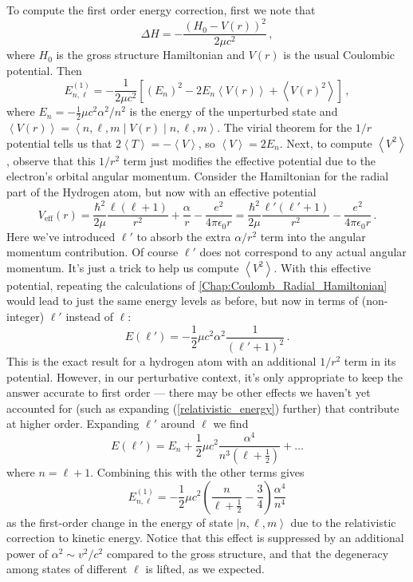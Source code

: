 \documentclass{article}
\theoremstyle{plain}\theoremheaderfont{\normalfont\itshape}\theorembodyfont{\rmfamily}\theoremseparator{.}\newtheorem*{rem}{Remark}\newtheorem*{ex}{Example}\newtheorem*{proof}{Proof}\newtheorem*{altp}{Alternative proof}
\theoremstyle{plain}\theoremheaderfont{\normalfont\bfseries}\theorembodyfont{\rmfamily}\theoremseparator{.}\newtheorem{thm}{Theorem}[section]\newtheorem{lem}[thm]{Lemma}\newtheorem{prop}[thm]{Proposition}\newtheorem*{cor}{Corollary}\newtheorem{defn}[thm]{Definition}\newtheorem{clm}[thm]{Claim}\newtheorem{clminproof}{Claim}
\theoremstyle{break}\theoremheaderfont{\normalfont\itshape}\theorembodyfont{\rmfamily}\theoremseparator{.\medskip}\newtheorem*{proofskip}{Proof}\newtheorem*{exs}{Examples}\newtheorem*{rems}{Remarks}
\theoremstyle{break}\theoremheaderfont{\normalfont\bfseries}\theorembodyfont{\rmfamily}\theoremseparator{.\medskip}\newtheorem{lemskip}[thm]{Lemma}\newtheorem{defnskip}[thm]{Definition}\newtheorem{propskip}[thm]{Proposition}\newtheorem{thmskip}[thm]{Theorem}
\numberwithin{equation}{section}
\newcommand{\ket}[1]{\left| #1 \right\rangle}
\newcommand{\eval}[1]{\left\langle #1 \right\rangle}
\newcommand{\expval}[2]{\left\langle #2 \middle| #1 \middle| #2 \right\rangle}
\begin{document}
    To compute the first order energy correction, first we note that
    \begin{equation}
        \Delta H=-\frac{(H_0-V(r))^2}{2\mu c^2}\,,
    \end{equation}
    where \(H_0\) is the gross structure Hamiltonian and \(V(r)\) is the usual Coulombic potential. Then
    \begin{equation}
        E_{n,\ell}^{(1)}=-\frac{1}{2\mu c^2}[(E_n)^2-2E_n\eval{V(r)}+\eval{V(r)^2}]\,,
    \end{equation}
    where \(E_n=-\frac{1}{2}\mu c^2\alpha^2/n^2\) is the energy of the unperturbed state and \(\eval{V(r)}=\expval{V(r)}{n,\ell,m}\). The virial theorem for the \(1/r\) potential tells us that \(2\eval{T}=-\eval{V}\), so \(\eval{V}=2E_n\). Next, to compute \(\eval{V^2}\), observe that this \(1/r^2\) term just modifies the effective potential due to the electron's orbital angular momentum. Consider the Hamiltonian for the radial part of the Hydrogen atom, but now with an effective potential
    \begin{equation}
        V_{\text{eff}}(r)=\frac{\hbar^2}{2\mu}\frac{\ell(\ell+1)}{r^2}+\frac{\alpha}{r}-\frac{e^2}{4\pi\epsilon_0 r}=\frac{\hbar^2}{2\mu}\frac{\ell'(\ell'+1)}{r^2}-\frac{e^2}{4\pi\epsilon_0 r}\,.
    \end{equation}
    Here we've introduced \(\ell'\) to absorb the extra \(\alpha/r^2\) term into the angular momentum contribution. Of course \(\ell'\) does not correspond to any actual angular momentum. It's just a trick to help us compute \(\eval{V^2}\). With this effective potential, repeating the calculations of \cref{Chap:Coulomb_Radial_Hamiltonian} would lead to just the same energy levels as before, but now in terms of (non-integer) \(\ell'\) instead of \(\ell\):
    \begin{equation}
        E(\ell')=-\frac{1}{2}\mu c^2\alpha^2\frac{1}{(\ell'+1)^2}\,.
    \end{equation}
    This is the exact result for a hydrogen atom with an additional \(1/r^2\) term in its potential. However, in our perturbative context, it's only appropriate to keep the answer accurate to first order --- there may be other effects we haven't yet accounted for (such as expanding (\ref{relativistic_energy}) further) that contribute at higher order. Expanding \(\ell'\) around \(\ell\) we find
    \begin{equation}
        E(\ell')=E_n+\frac{1}{2}\mu c^2\frac{\alpha^4}{n^3(\ell+\frac{1}{2})}+\dots
    \end{equation}
    where \(n=\ell+1\). Combining this with the other terms gives
    \begin{equation}\label{relativistic_correction}
        E_{n,\ell}^{(1)}=-\frac{1}{2}\mu c^2\left(\frac{n}{\ell+\frac{1}{2}}-\frac{3}{4}\right)\frac{\alpha^4}{n^4}
    \end{equation}
    as the first-order change in the energy of state \(\ket{n,\ell,m}\) due to the relativistic correction to kinetic energy. Notice that this effect is suppressed by an additional power of \(\alpha^2\sim v^2/c^2\) compared to the gross structure, and that the degeneracy among states of different \(\ell\) is lifted, as we expected.
\end{document}
